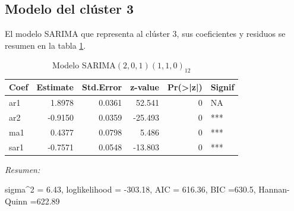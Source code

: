 \documentclass[12pt,oneside]{book}\usepackage[]{graphicx}\usepackage[]{color}
\newenvironment{knitrout}{}{} %
\theoremstyle{definition} %
\begin{document}
\subsection{Modelo del clúster 3}

El modelo SARIMA que representa al clúster 3, sus coeficientes y residuos se resumen en la tabla \ref{tab:sarima_cl3}.



\begin{knitrout}
\color{fgcolor}\begin{table}

\caption{\label{tab:unnamed-chunk-84}\label{tab:sarima_cl3}Modelo SARIMA$(2,0,1)(1,1,0)_{12}$}
\centering
\begin{threeparttable}
\begin{tabular}[t]{lrrrrl}
\toprule
Coef & Estimate & Std.Error & z-value & Pr(>|z|) & Signif\\
\midrule
\rowcolor{gray!6}  ar1 & 1.8978 & 0.0361 & 52.541 & 0 & NA\\
ar2 & -0.9150 & 0.0359 & -25.493 & 0 & ***\\
\rowcolor{gray!6}  ma1 & 0.4377 & 0.0798 & 5.486 & 0 & ***\\
sar1 & -0.7571 & 0.0548 & -13.803 & 0 & ***\\
\bottomrule
\end{tabular}
\begin{tablenotes}
\item \textit{Resumen:} 
\item sigma\textasciicircum{}2 = 6.43, loglikelihood = -303.18, AIC = 616.36, BIC =630.5, Hannan-Quinn =622.89
\end{tablenotes}
\end{threeparttable}
\end{table}


\end{knitrout}
\end{document}
